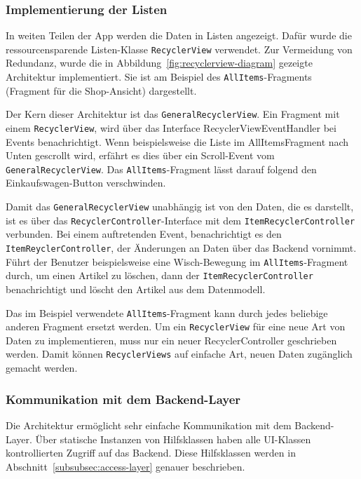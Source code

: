 \subsubsection{Implementierung der Listen}

In weiten Teilen der App werden die Daten in Listen angezeigt.
Dafür wurde die ressourcensparende Listen-Klasse \texttt{RecyclerView} verwendet.
Zur Vermeidung von Redundanz, wurde die in Abbildung~\ref{fig:recyclerview-diagram} gezeigte Architektur implementiert.
Sie ist am Beispiel des \texttt{AllItems}-Fragments (Fragment für die Shop-Ansicht) dargestellt.

Der Kern dieser Architektur ist das \texttt{GeneralRecyclerView}.
Ein Fragment mit einem \texttt{RecyclerView}, wird über das Interface RecyclerViewEventHandler bei Events benachrichtigt.
Wenn beispielsweise die Liste im AllItemsFragment nach Unten gescrollt wird, erfährt es dies über ein Scroll-Event vom \texttt{GeneralRecyclerView}.
Das \texttt{AllItems}-Fragment lässt darauf folgend den Einkaufswagen-Button verschwinden.

Damit das \texttt{GeneralRecyclerView} unabhängig ist von den Daten, die es darstellt, ist es über das \texttt{RecyclerController}-Interface mit dem \texttt{ItemRecyclerController} verbunden.
Bei einem auftretenden Event, benachrichtigt es den \texttt{ItemReyclerController}, der Änderungen an Daten über das Backend vornimmt.
Führt der Benutzer beispielsweise eine Wisch-Bewegung im \texttt{AllItems}-Fragment durch, um einen Artikel zu löschen, dann der \texttt{ItemRecyclerController} benachrichtigt und löscht den Artikel aus dem Datenmodell.

Das im Beispiel verwendete \texttt{AllItems}-Fragment kann durch jedes beliebige anderen Fragment ersetzt werden.
Um ein \texttt{RecyclerView} für eine neue Art von Daten zu implementieren, muss nur ein neuer RecyclerController geschrieben werden.
Damit können \texttt{RecyclerViews} auf einfache Art, neuen Daten zugänglich gemacht werden.


\subsubsection{Kommunikation mit dem Backend-Layer}

Die Architektur ermöglicht sehr einfache Kommunikation mit dem Backend-Layer.
Über statische Instanzen von Hilfsklassen haben alle UI-Klassen kontrollierten Zugriff auf das Backend.
Diese Hilfsklassen werden in Abschnitt~\ref{subsubsec:access-layer} genauer beschrieben.

